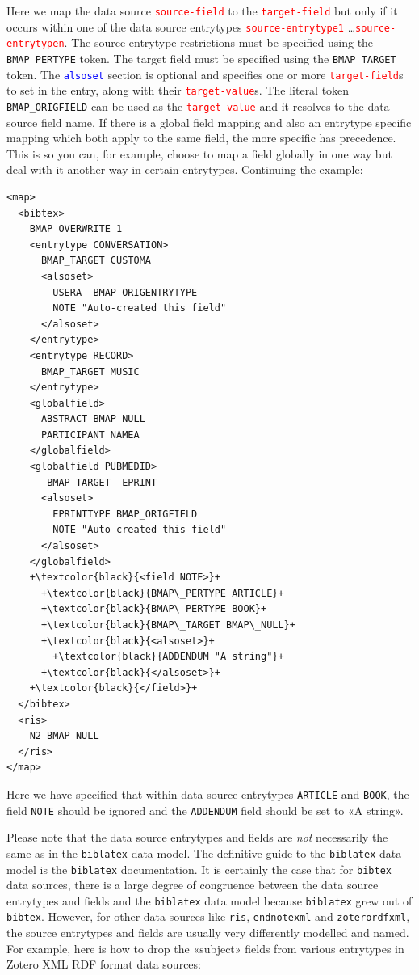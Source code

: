 \documentclass{ltxdockit}
\begin{document}
\noindent Here we map the data source
\textcolor{red}{\texttt{source-field}} to the
\textcolor{red}{\texttt{target-field}} but only if it occurs within one of
the data source entrytypes \textcolor{red}{\texttt{source-entrytype1}}
\ldots\linebreak\textcolor{red}{\texttt{source-entrytypen}}. The source
entrytype restrictions must be specified using the \verb+BMAP_PERTYPE+
token. The target field must be specified using the \verb+BMAP_TARGET+
token. The \textcolor{blue}{\texttt{alsoset}} section is optional and
specifies one or more \textcolor{red}{\texttt{target-field}}s to set in the
entry, along with their \textcolor{red}{\texttt{target-value}}s. The
literal token \verb+BMAP_ORIGFIELD+ can be used as the
\textcolor{red}{\texttt{target-value}} and it resolves to the data source
field name. If there is a global field mapping and also an entrytype
specific mapping which both apply to the same field, the more specific has
precedence. This is so you can, for example, choose to map a field globally
in one way but deal with it another way in certain entrytypes. Continuing
the example: 

{\color{grey}
\lstset{showspaces=false}
\begin{lstlisting}[escapechar=+,mathescape=true]
<map>
  <bibtex>
    BMAP_OVERWRITE 1
    <entrytype CONVERSATION>
      BMAP_TARGET CUSTOMA
      <alsoset>
        USERA  BMAP_ORIGENTRYTYPE
        NOTE "Auto-created this field"
      </alsoset>
    </entrytype>
    <entrytype RECORD>
      BMAP_TARGET MUSIC
    </entrytype>
    <globalfield>
      ABSTRACT BMAP_NULL
      PARTICIPANT NAMEA
    </globalfield>
    <globalfield PUBMEDID>
       BMAP_TARGET  EPRINT
      <alsoset>
        EPRINTTYPE BMAP_ORIGFIELD
        NOTE "Auto-created this field"
      </alsoset>
    </globalfield>
    +\textcolor{black}{<field NOTE>}+
      +\textcolor{black}{BMAP\_PERTYPE ARTICLE}+
      +\textcolor{black}{BMAP\_PERTYPE BOOK}+
      +\textcolor{black}{BMAP\_TARGET BMAP\_NULL}+
      +\textcolor{black}{<alsoset>}+
        +\textcolor{black}{ADDENDUM "A string"}+
      +\textcolor{black}{</alsoset>}+
    +\textcolor{black}{</field>}+
  </bibtex>
  <ris>
    N2 BMAP_NULL
  </ris>
</map>
\end{lstlisting}
}

\noindent Here we have specified that within data
source entrytypes \verb+ARTICLE+ and \verb+BOOK+, the field \verb+NOTE+
should be ignored and the \verb+ADDENDUM+ field should be set to «A
string».

Please note that the data source entrytypes and fields are \emph{not}
necessarily the same as in the \verb+biblatex+ data model. The definitive
guide to the \verb+biblatex+ data model is the \verb+biblatex+
documentation. It is certainly the case that for \verb+bibtex+ data
sources, there is a large degree of congruence between the data source
entrytypes and fields and the \verb+biblatex+ data model because
\verb+biblatex+ grew out of \verb+bibtex+. However, for other data sources
like \verb+ris+, \verb+endnotexml+ and \verb+zoterordfxml+, the source
entrytypes and fields are usually very differently modelled and named. For
example, here is how to drop the «subject» fields from various entrytypes
in Zotero XML RDF format data sources:
\end{document}
